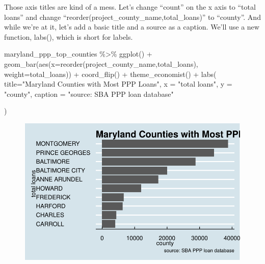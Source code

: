 \documentclass[
  letterpaper,
  DIV=11,
  numbers=noendperiod]{scrreprt}
\newenvironment{Shaded}{\begin{snugshade}}{\end{snugshade}}
\newcommand{\AttributeTok}[1]{\textcolor[rgb]{0.40,0.45,0.13}{#1}}
\newcommand{\FunctionTok}[1]{\textcolor[rgb]{0.28,0.35,0.67}{#1}}
\newcommand{\NormalTok}[1]{\textcolor[rgb]{0.00,0.23,0.31}{#1}}
\newcommand{\SpecialCharTok}[1]{\textcolor[rgb]{0.37,0.37,0.37}{#1}}
\newcommand{\StringTok}[1]{\textcolor[rgb]{0.13,0.47,0.30}{#1}}
\begin{document}
Those axis titles are kind of a mess. Let's change ``count'' on the x
axis to ``total loans'' and change
``reorder(project\_county\_name,total\_loans)'' to ``county''. And while
we're at it, let's add a basic title and a source as a caption. We'll
use a new function, labs(), which is short for labels.

\begin{Shaded}
\begin{Highlighting}[]
\NormalTok{maryland\_ppp\_top\_counties }\SpecialCharTok{\%\textgreater{}\%}
  \FunctionTok{ggplot}\NormalTok{() }\SpecialCharTok{+}
  \FunctionTok{geom\_bar}\NormalTok{(}\FunctionTok{aes}\NormalTok{(}\AttributeTok{x=}\FunctionTok{reorder}\NormalTok{(project\_county\_name,total\_loans), }\AttributeTok{weight=}\NormalTok{total\_loans)) }\SpecialCharTok{+}
  \FunctionTok{coord\_flip}\NormalTok{() }\SpecialCharTok{+}
  \FunctionTok{theme\_economist}\NormalTok{() }\SpecialCharTok{+}
  \FunctionTok{labs}\NormalTok{(}
    \AttributeTok{title=}\StringTok{"Maryland Counties with Most PPP Loans"}\NormalTok{,}
    \AttributeTok{x =} \StringTok{"total loans"}\NormalTok{,}
    \AttributeTok{y =} \StringTok{"county"}\NormalTok{,}
    \AttributeTok{caption =} \StringTok{"source: SBA PPP loan database"}

\NormalTok{  )}
\end{Highlighting}
\end{Shaded}

\begin{figure}[H]

{\centering \includegraphics{./visualizing-for-reporting_files/figure-pdf/unnamed-chunk-11-1.pdf}

}

\end{figure}
\end{document}
